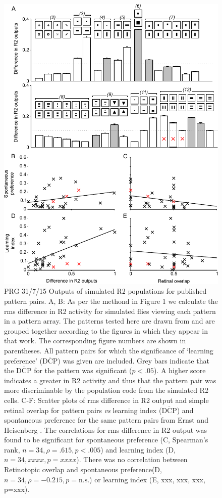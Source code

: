 \begin{figure}
\centering
\includegraphics{figures/pattern}
\caption{ PRG 31/7/15 Outputs of simulated R2 populations for published pattern pairs.
A, B: As per the methond in Figure 1 we calculate the \ac{rms} difference in R2 activity for simulated flies viewing each pattern in a pattern array. The patterns tested here are drawn from \protect\cite{Ernst1999} and are grouped together according to the figures in which they appear in that work.
The corresponding figure numbers are shown in parentheses.
All pattern pairs for which the significance of `learning preference' ($\overline{\mathrm{DCP}}$) was given are included. Grey bars indicate that the $\overline{\mathrm{DCP}}$ for the pattern was significant ($p<.05$).
A higher score indicates a greater in R2 activity and thus that the pattern pair was more discriminable by the population code from the simulated R2 cells.
C-F: Scatter plots of \ac{rms} difference in R2 output and simple retinal overlap for pattern pairs \emph{vs} learning index ($\overline{\mathrm{DCP}}$) and spontaneous preference for the same pattern pairs from Ernst and Heisenberg \protect\cite{Ernst1999}.
The correlations for \ac{rms} difference in R2 output was found to be significant for spontaneous preference (C, Spearman's rank, $n=34, \rho=.615, p<.005$) and learning index (D, $n=34, xxxx, p=xxxx$). There was no correlation between Retinotopic overlap and spontaneous preference(D, $n=34, \rho= -0.215, p=\mathrm{n.s.}$) or learning index (E, xxx, xxx, xxx, p=xxx).
}
\label{fig:pattern}
\end{figure}
